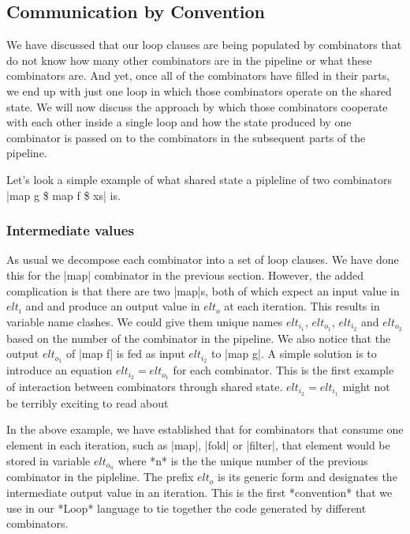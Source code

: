 \subsection{Communication by Convention}

We have discussed that our loop clauses are being populated by combinators that do not know how many other combinators are in the pipeline or what these combinators are. And yet, once all of the combinators have filled in their parts, we end up with just one loop in which those combinators operate on the shared state. We will now discuss the approach by which those combinators cooperate with each other inside a single loop and how the state produced by one combinator is passed on to the combinators in the subsequent parts of the pipeline.

Let's look a simple example of what shared state a pipleline of two combinators |map g \$ map f \$ xs| is.


\subsubsection{\label{sec:Loop:Elts}Intermediate values}

As usual we decompose each combinator into a set of loop clauses. We have done this for the |map| combinator in the previous section. However, the added complication is that there are two |map|s, both of which expect an input value in $elt_i$ and and produce an output value in $elt_o$ at each iteration. This results in variable name clashes. We could give them unique names $elt_{i_1}$, $elt_{o_1}$, $elt_{i_2}$ and $elt_{o_2}$ based on the number of the combinator in the pipeline. We also notice that the output $elt_{o_1}$ of |map f| is fed as input $elt_{i_2}$ to |map g|. A simple solution is to introduce an equation $elt_{i_2} = elt_{o_1}$ for each combinator. This is the first example of interaction between combinators through shared state.
 $elt_{i_2} = elt_{i_1}$ might not be terribly exciting to read about

In the above example, we have established that for combinators that consume one element in each iteration, such as |map|, |fold| or |filter|, that element would be stored in variable $elt_{o_n}$ where *n* is the the unique number of the previous combinator in the pipleline. The prefix $elt_o$ is its generic form and designates the intermediate output value in an iteration. This is the first *convention* that we use in our *Loop* language to tie together the code generated by different combinators.

